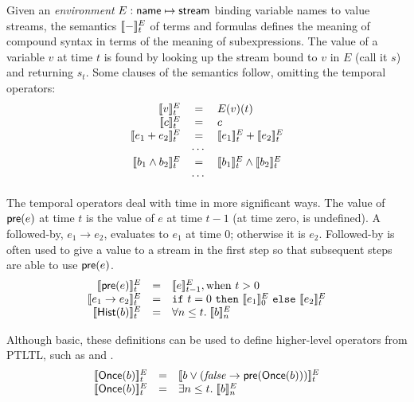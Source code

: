 Given an \emph{environment} $E : \mathsf{name} \mapsto \mathsf{stream}$
binding variable names to value streams, the semantics $[\![ - ]\!]^E_t$
of terms and formulas defines the meaning of compound syntax in terms
of the meaning of subexpressions. The value of a variable $v$ at time
$t$ is found by looking up the stream bound to $v$ in $E$ (call it
$s$) and returning $s_t$. Some clauses of the semantics follow,
omitting the temporal operators:
\[
\begin{array}{rcl}
\sem{v}^E_t & = & E(v)(t) \\
\sem{c}^E_t & = & c \\
\sem{e_1 + e_2}^E_t & = & \sem{e_1}^E_t + \sem{e_2}^E_t \\
   & \cdots & \\
\sem{b_1 \land b_2}^E_t & = & \sem{b_1}^E_t \land \sem{b_2}^E_t \\
   & \cdots & \\
\end{array}
\]

The temporal operators deal with time in more significant ways. The
value of $\mathsf{pre}(e)$ at time $t$ is the value of $e$ at time
$t-1$ (at time zero,  is undefined).  
A followed-by, $e_1 \to e_2$, evaluates to $e_1$ at time 0; otherwise it is $e_2$.
Followed-by is often used to give a value to a stream in the first step so that subsequent steps are able to use $\mathsf{pre}(e)$.
\[
\begin{array}{rcl}
\sem{\konst{pre}(e)}^E_t & = & \sem{e}^E_{t-1}, \mathrm{when}\ t > 0 \\
\sem{e_1 \to e_2}^E_t & = & \itelse{t=0}{\sem{e_1}^E_0}{\sem{e_2}^E_t} \\
\sem{\konst{Hist}(b)}^E_t & = & \forall n \leq t.\; \sem{b}^E_n
\end{array}
\]

Although basic, these definitions can be used to define higher-level
operators from PTLTL, such as  and . 
\[
   \begin{array}{rcl}
      \sem{\konst{Once}(b)}^E_t & = & \sem{b \vee (\mathit{false} \to \konst{pre}(\konst{Once}(b)))}^E_t \\
      \sem{\konst{Once}(b)}^E_t & = & \exists n \leq t.\; \sem{b}^E_n
   \end{array}
\]
